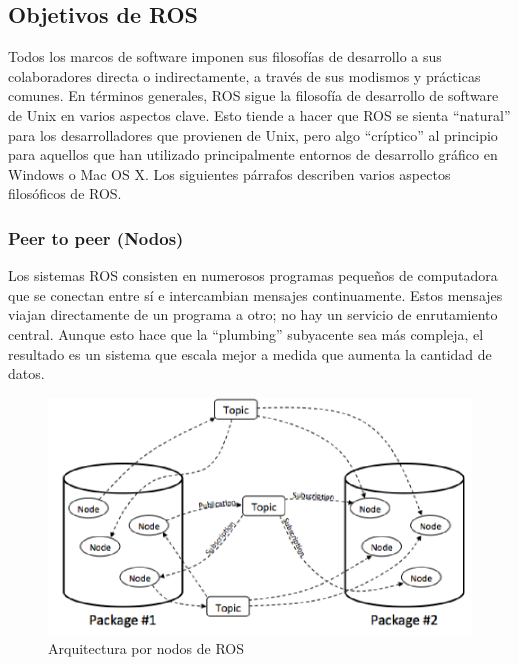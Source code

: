     \newpage

        
    \subsection{Objetivos de ROS}
    
        Todos los marcos de software imponen sus filosofías de desarrollo a sus colaboradores directa o indirectamente, a través de sus modismos y prácticas comunes. En términos generales, ROS sigue la filosofía de desarrollo de software de Unix en varios aspectos clave. Esto tiende a hacer que ROS se sienta ``natural'' para los desarrolladores que provienen de Unix, pero algo ``críptico'' al principio para aquellos que han utilizado principalmente entornos de desarrollo gráfico en Windows o Mac OS X. Los siguientes párrafos describen varios aspectos filosóficos de ROS.
        
        \subsubsection{Peer to peer (Nodos)}
        
            Los sistemas ROS consisten en numerosos programas pequeños de computadora que se conectan entre sí e intercambian mensajes continuamente. Estos mensajes viajan directamente de un programa a otro; no hay un servicio de enrutamiento central. Aunque esto hace que la ``plumbing'' subyacente sea más compleja, el resultado es un sistema que escala mejor a medida que aumenta la cantidad de datos.
            
            \begin{figure}[htb]
                \centering
                \includegraphics[width=0.8\linewidth]{Main/Chapter3/Images3/arquitectura_por_nodos_1.png}
                \caption{Arquitectura por nodos de ROS}
                \label{f:Cap3-5_arquitectura_ros}
            \end{figure}
            
